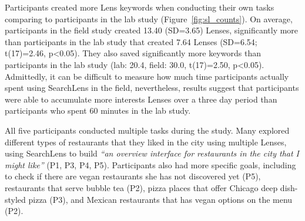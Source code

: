 Participants created more Lens keywords when conducting their own tasks comparing to participants in the lab study (Figure~\ref{fig:sl_counts}). On average, participants in the field study created 13.40 (SD=3.65) Lenses, significantly more than participants in the lab study that created 7.64 Lenses (SD=6.54; t(17)=2.46, p<0.05). They also saved significantly more keywords than participants in the lab study (lab: 20.4, field: 30.0, t(17)=2.50, p<0.05).
Admittedly, it can be difficult to measure how much time participants actually spent using SearchLens in the field, nevertheless, results suggest that participants were able to accumulate more interests Lenses over a three day period than participants who spent 60 minutes in the lab study.

All five participants conducted multiple tasks during the study. Many explored different types of restaurants that they liked in the city using multiple Lenses, using SearchLens to build \emph{``an overview interface for restaurants in the city that I might like''} (P1, P3, P4, P5). Participants also had more specific goals, including to check if there are vegan restaurants she has not discovered yet (P5), restaurants that serve bubble tea (P2), pizza places that offer Chicago deep dish-styled pizza (P3), and Mexican restaurants that has vegan options on the menu (P2).




%    

